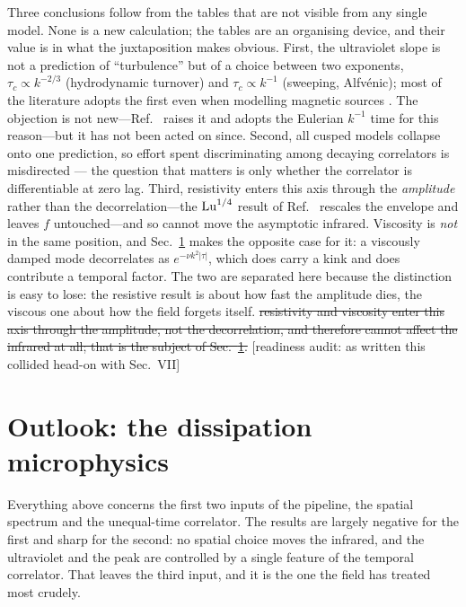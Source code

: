 \documentclass[10pt,prd,aps,nobibnotes,superscriptaddress,preprintnumbers,notitlepage]{revtex4-1}
\newcommand{\add}[1]{{\color{red}#1}}
\newcommand{\del}[1]{{\color{red}\sout{#1}}}
\newcommand{\why}[1]{{\color{red}\footnotesize\textsf{[#1]}}}
\newcommand{\add}[1]{#1}
\newcommand{\del}[1]{}
\newcommand{\why}[1]{}
\begin{document}
Three conclusions follow from the tables that are not visible from any single
model. None is a new calculation; the tables are an organising device, and their
value is in what the juxtaposition makes obvious. First, the ultraviolet slope is not a prediction of ``turbulence'' but of
a choice between two exponents, $\tau_c\propto k^{-2/3}$ (hydrodynamic turnover)
and $\tau_c\propto k^{-1}$ (sweeping, Alfv\'enic); most of the literature adopts
the first even when modelling magnetic sources
\cite{Gogoberidze:2007an,Kahniashvili:2008pe,Kahniashvili:2009mf}. The objection is
not new---Ref.~\cite{Niksa:2018ofa} raises it and adopts the Eulerian $k^{-1}$ time
for this reason---but it has not been acted on since. Second, all cusped models
collapse onto one prediction, so effort spent discriminating among decaying
correlators is misdirected --- the question that matters is only whether the
correlator is differentiable at zero lag. Third, \add{resistivity enters
this axis through the \emph{amplitude} rather than the decorrelation---the
${\rm Lu}^{1/4}$ result of Ref.~\cite{Brandenburg:2024tyi} rescales the envelope and
leaves $f$ untouched---and so cannot move the asymptotic infrared. Viscosity is
\emph{not} in the same position, and Sec.~\ref{sec:outlook} makes the opposite case for
it: a viscously damped mode decorrelates as $e^{-\nu k^{2}|\tau|}$, which does carry a
kink and does contribute a temporal factor. The two are separated here because the
distinction is easy to lose: the resistive result is about how fast the amplitude dies,
the viscous one about how the field forgets itself.}
\del{resistivity and viscosity enter this axis through the amplitude, not the
decorrelation, and therefore cannot affect the infrared at all; that is the subject of
Sec.~\ref{sec:outlook}.}
\why{readiness audit: as written this collided head-on with Sec.~VII}

\section{Outlook: the dissipation microphysics}
\label{sec:outlook}

Everything above concerns the first two inputs of the pipeline, the spatial
spectrum and the unequal-time correlator. The results are largely negative for the
first and sharp for the second: no spatial choice moves the infrared, and the
ultraviolet and the peak are controlled by a single feature of the temporal
correlator. That leaves the third input, and it is the one the field has treated
most crudely.
\end{document}
